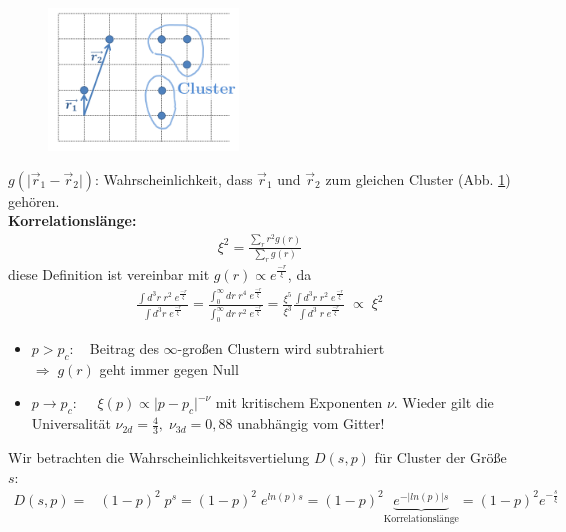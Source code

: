 \documentclass[12pt]{article}
\begin{document}
 	\begin{figure}[ht]
\centering
\includegraphics[width=0.45\textwidth]{Folie49.png}
	\caption{}
	\label{fig:Korrelationsfunktion}
\end{figure}

 	 $g( \vert \vec{r}_1 - \vec{r}_2 \vert)$: Wahrscheinlichkeit, dass $\vec{r}_1$ und $\vec{r}_2$ zum gleichen Cluster (Abb. \ref{fig:Korrelationsfunktion}) gehören. \\
 	\textbf{Korrelationslänge:}
 	 \begin{align}
 	\xi^2= \frac{\sum_r r^2 g(r)}{\sum_r g(r)}
 	\end{align}
 	diese Definition ist vereinbar mit $g(r) \propto e^\frac{-r}{\xi}$, da 
 	\begin{align}
 	\frac{\int d^3r \; r^2 \; e^\frac{-r}{\xi}}{\int d^3 r \; e^\frac{-r}{\xi}}
 	= \frac{\int_0^\infty dr \; r^4 \; e^\frac{-r}{\xi}}{\int_0^\infty d r \; r^2 \; e^\frac{-r}{\xi}}
 	= \frac{\xi^5}{\xi^3}  \frac{\int d^3r \; r^2 \; e^\frac{-r}{\xi}}{\int d^3\;  r \; e^\frac{-r}{\xi}} \; \propto \; \xi^2
 	\end{align}
 	
 	\begin{itemize}
 	\item $p>p_c: \quad$Beitrag des $\infty$-großen Clustern wird subtrahiert \\ $\Rightarrow \; g(r)$ geht immer gegen Null
 	\item $p \to p_c: \quad $ $\xi(p) \propto \vert p-p_c \vert^{-\nu}$ mit kritischem Exponenten $\nu$. Wieder gilt die Universalität $\nu_{2d} = \frac{4}{3}, \; \nu_{3d} = 0,88$ unabhängig vom Gitter!
 	
 	\end{itemize}

 	 	Wir betrachten die Wahrscheinlichkeitsvertielung $D(s,p)$ für Cluster der Größe $s$: 
\begin{align}
 	D(s,p)=& (1-p)^2 \; p^s
 	= (1-p)^2 \; e^{ln(p)s} = (1-p)^2 \underbrace{e^{- \vert ln(p) \vert s}}_\text{Korrelationslänge} = (1-p)^2 e^{-\frac{s}{\xi}}
\end{align}
\end{document}
